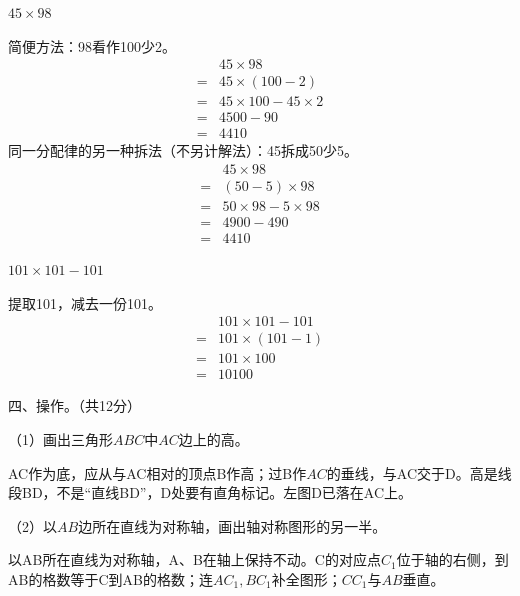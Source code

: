 \(45\times98\)\par
\begin{BookAnswer}
简便方法：98看作100少2。\[\begin{aligned} &45\times98\\ ={}&45\times(100-2)\\ ={}&45\times100-45\times2\\ ={}&4500-90\\ ={}&4410\end{aligned}\]同一分配律的另一种拆法（不另计解法）：45拆成50少5。\[\begin{aligned} &45\times98\\ ={}&(50-5)\times98\\ ={}&50\times98-5\times98\\ ={}&4900-490\\ ={}&4410\end{aligned}\]
\end{BookAnswer}

\(101\times101-101\)\par
\begin{BookAnswer}
提取101，减去一份101。\[\begin{aligned} &101\times101-101\\ ={}&101\times(101-1)\\ ={}&101\times100\\ ={}&10100\end{aligned}\]
\end{BookAnswer}

四、操作。（共12分）\par （1）画出三角形\(ABC\)中\(AC\)边上的高。\par
{}
\begin{BookAnswer}
AC作为底，应从与AC相对的顶点B作高；过B作\(AC\)的垂线，与AC交于D。高是线段BD，不是“直线BD”，D处要有直角标记。左图D已落在AC上。
\end{BookAnswer}

（2）以\(AB\)边所在直线为对称轴，画出轴对称图形的另一半。\par
{}
\begin{BookAnswer}
以AB所在直线为对称轴，A、B在轴上保持不动。C的对应点\(C_1\)位于轴的右侧，到AB的格数等于C到AB的格数；连\(AC_1,BC_1\)补全图形；\allowbreak{}\(CC_1\)与\(AB\)垂直。
\end{BookAnswer}

